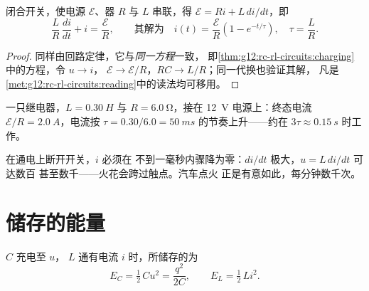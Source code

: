 \begin{proposition}[RL 电路中的电流上升]\label{prop:g12:rc-rl-circuits:rl}
闭合开关，使电源 $\mathcal{E}$、器 $R$
与 $L$ 串联，得 $\mathcal{E} = Ri + L\,di/dt$，即
\[
\frac{L}{R}\,\frac{di}{dt} + i = \frac{\mathcal{E}}{R},
\qquad\text{其解为}\quad
i(t) = \frac{\mathcal{E}}{R}\left(1 - e^{-t/\tau}\right),
\quad \tau = \frac{L}{R} .
\]
\end{proposition}

\begin{proof}
同样由回路定律，它与\emph{同一方程}一致，
即\cref{thm:g12:rc-rl-circuits:charging} 中的方程，令 $u \to i$，
$\mathcal{E} \to \mathcal{E}/R$，$RC \to L/R$；同一代换也验证其解，
凡是
\cref{met:g12:rc-rl-circuits:reading}中的读法均可移用。
\end{proof}

\begin{example}[电磁铁开始工作]\label{ex:g12:rc-rl-circuits:rl}
一只继电器，$L = \qty{0.30}{H}$ 与 $R = \qty{6.0}{\ohm}$，接在
\qty{12}{V} 电源上：终态电流 $\mathcal{E}/R = \qty{2.0}{A}$，电流按
$\tau = 0.30/6.0 = \qty{50}{ms}$ 的节奏上升——约在 $3\tau \approx
\qty{0.15}{s}$ 时工作。
\end{example}

\begin{remark}[断开开关时的火花]\label{rem:g12:rc-rl-circuits:spark}
在通电上断开开关，$i$ 必须在
不到一毫秒内骤降为零：$di/dt$ 极大，$u = L\,di/dt$ 可达数百
甚至数千——火花会跨过触点。汽车点火
正是有意如此，每分钟数千次。
\end{remark}

\section{储存的能量}

\begin{proposition}[电容器中的能量与线圈中的能量]\label{prop:g12:rc-rl-circuits:energy}
 $C$ 充电至 $u$， $L$ 通有电流
$i$ 时，所储存的为
\[
E_C = \tfrac12\,C u^2 = \frac{q^2}{2C},
\qquad
E_L = \tfrac12\,L i^2 .
\]
\end{proposition}


